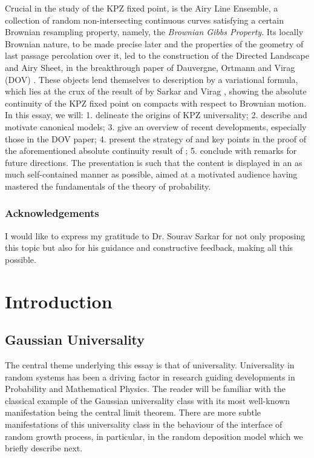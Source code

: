 \documentclass[12pt]{report}
\theoremstyle{plain}
\begin{document}
Crucial in the study of the KPZ fixed point, is the Airy Line Ensemble, a collection of random non-intersecting continuous curves satisfying a certain Brownian resampling property, namely, the \textit{Brownian Gibbs Property}. Its locally Brownian nature, to be made precise later and the properties of the geometry of last passage percolation over it, led to the construction of the Directed Landscape and Airy Sheet, in the breakthrough paper of Dauvergne, Ortmann and Virag (DOV) \cite{DOV}. These objects lend themselves to description by a variational formula, which lies at the crux of the result of by Sarkar and Virag \cite{sarkar2021brownian}, showing the absolute continuity of the KPZ fixed point on compacts with respect to Brownian motion. \\

In this essay, we will: 1. delineate the origins of KPZ universality; 2. describe and motivate canonical models; 3. give an overview of recent developments, especially those in the DOV paper; 4. present the strategy of and key points in the proof of the aforementioned absolute continuity result of \cite{sarkar2021brownian}; 5. conclude with remarks for future directions. The presentation is such that the content is displayed in an as much self-contained manner as possible, aimed at a motivated audience having mastered the fundamentals of the theory of probability.

\subsection*{Acknowledgements}
\noindent I would like to express my gratitude to Dr. Sourav Sarkar for not only proposing this topic but also for his guidance and constructive feedback, making all this possible. 

\chapter{Introduction}

\section{Gaussian Universality}

The central theme underlying this essay is that of universality. Universality in random systems has been a driving factor in research guiding developments in Probability and Mathematical Physics. The reader will be familiar with the classical example of the Gaussian universality class with its most well-known manifestation being the central limit theorem. There are more subtle manifestations of this universality class in the behaviour of the interface of random growth process, in particular, in the random deposition model which we briefly describe next.\\
\end{document}
